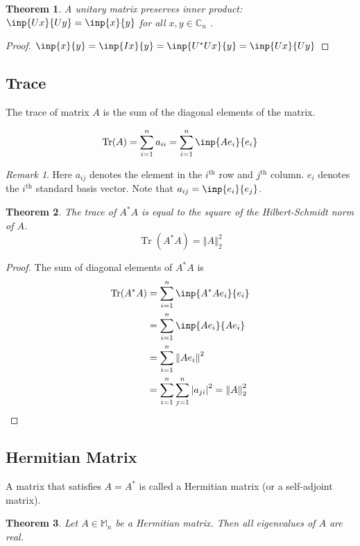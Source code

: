 \documentclass[twofold]{article}
\newcommand*\adj[1]{#1^*}
\newcommand*\norm[1]{\left \Vert #1 \right\Vert}
\newcommand*\abs[1]{\left \vert #1 \right\vert}
\DeclareMathOperator{\Tr}{Tr}
\theoremstyle{plain}
\newtheorem{theorem}{Theorem}
\theoremstyle{definition}
\theoremstyle{remark}
\newtheorem*{remark}{Remark}
\begin{document}
\begin{theorem} A unitary matrix preserves inner product: \(\inp{Ux}{Uy} = \inp{x}{y}\) for all  \(x, y \in \mathbb{C}_n\) . \end{theorem}

\begin{proof} \(\inp{x}{y} = \inp{Ix}{y} = \inp{\adj{U}U x}{y} = \inp{Ux}{Uy}\) \end{proof}

\subsection{Trace}
The trace of matrix \(A\) is the sum of the diagonal elements of the matrix.

\[\Tr(A) = \sum_{i=1} ^n a_{ii} = \sum_{i=1} ^n \inp{Ae_i}{ e_i}\]

\begin{remark}Here \(a_{ij}\) denotes the element in the \(i^{\text{th}}\) row and \(j^{\text{th}}\) column. \(e_i\) denotes the \(i^{\text{th}}\) standard basis vector. Note that \(a_{ij} = \inp{e_i}{e_j}\).\end{remark}

\begin{theorem}The trace of \(\adj{A}A\) is equal to the square of the Hilbert-Schmidt norm of \(A\). \[\Tr( \adj{A} A ) = \norm{A}_2^2\]\end{theorem}
\begin{proof}
The sum of diagonal elements of \(\adj{A} A\) is
 \begin{equation*} \begin{split} 
\Tr(\adj{A} A) & = \sum_{i=1}^n \inp{\adj{A}A e_i}{e_i} \\
 & = \sum_{i=1} ^n \inp{Ae_i}{Ae_i} \\
& = \sum_{i=1} ^n \norm{Ae_i}^2 \\
& = \sum_{i=1} ^n \sum_{j=1} ^n \abs{a_{ji}}^2  = \norm{A}^2_2
\end{split} \end{equation*}
 \end{proof}

\subsection{Hermitian Matrix}
A matrix that satisfies \(A = \adj{A}\) is called a Hermitian matrix (or a self-adjoint matrix). 

\begin{theorem} \label{herm_eig_real} Let \(A \in \mathbb{M}_n\) be a Hermitian matrix. Then all eigenvalues of \(A\) are real. \end{theorem}
\end{document}
